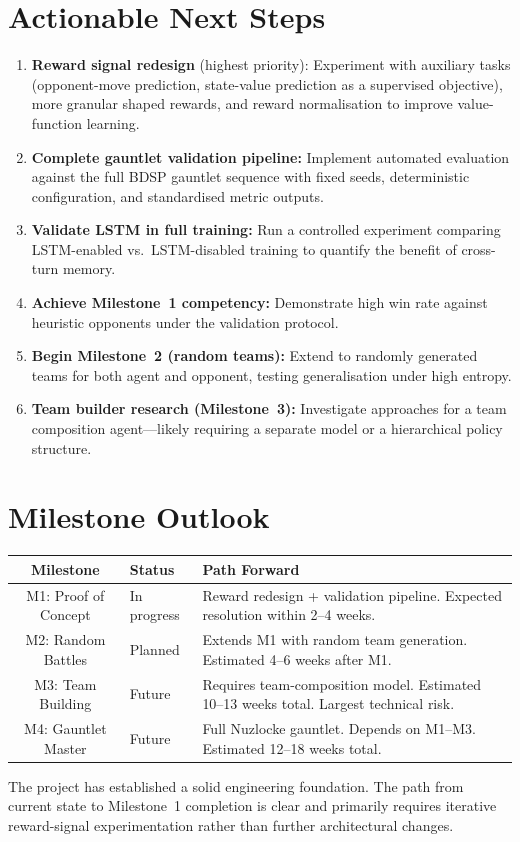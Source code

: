 \section{Actionable Next Steps}

\begin{enumerate}
  \item \textbf{Reward signal redesign} (highest priority): Experiment with
        auxiliary tasks (opponent-move prediction, state-value prediction as
        a supervised objective), more granular shaped rewards, and reward
        normalisation to improve value-function learning.

  \item \textbf{Complete gauntlet validation pipeline:} Implement automated
        evaluation against the full BDSP gauntlet sequence with fixed seeds,
        deterministic configuration, and standardised metric outputs.

  \item \textbf{Validate LSTM in full training:} Run a controlled experiment
        comparing LSTM-enabled vs.\ LSTM-disabled training to quantify the
        benefit of cross-turn memory.

  \item \textbf{Achieve Milestone~1 competency:} Demonstrate high win rate
        against heuristic opponents under the validation protocol.

  \item \textbf{Begin Milestone~2 (random teams):} Extend to randomly
        generated teams for both agent and opponent, testing generalisation
        under high entropy.

  \item \textbf{Team builder research (Milestone~3):} Investigate approaches
        for a team composition agent---likely requiring a separate model or a
        hierarchical policy structure.
\end{enumerate}

\section{Milestone Outlook}

\begin{center}
\small
\begin{tabularx}{\textwidth}{c l X}
  \toprule
  \textbf{Milestone} & \textbf{Status} & \textbf{Path Forward} \\
  \midrule
  M1: Proof of Concept & In progress &
    Reward redesign + validation pipeline.  Expected resolution within
    2--4 weeks. \\
  M2: Random Battles & Planned &
    Extends M1 with random team generation.  Estimated 4--6 weeks
    after M1. \\
  M3: Team Building & Future &
    Requires team-composition model.  Estimated 10--13 weeks total.
    Largest technical risk. \\
  M4: Gauntlet Master & Future &
    Full Nuzlocke gauntlet.  Depends on M1--M3.  Estimated 12--18 weeks
    total. \\
  \bottomrule
\end{tabularx}
\end{center}

The project has established a solid engineering foundation.  The path from
current state to Milestone~1 completion is clear and primarily requires
iterative reward-signal experimentation rather than further architectural
changes.
